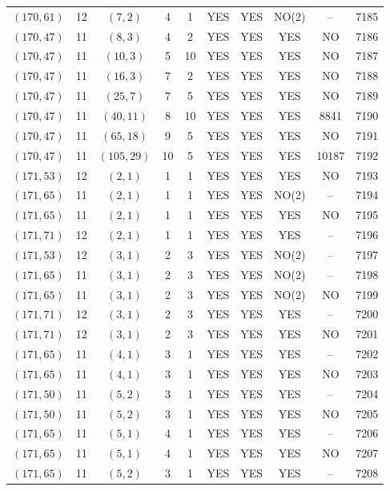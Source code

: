 \begin{longtable}{|c|c|c|c|c|c|c|c|c|c|}
$(170, 61)$ & 12 & $(7, 2)$ & 4 & 1 & YES & YES & NO(2) & -- & 7185\\
$(170, 47)$ & 11 & $(8, 3)$ & 4 & 2 & YES & YES & YES & NO & 7186\\
$(170, 47)$ & 11 & $(10, 3)$ & 5 & 10 & YES & YES & YES & NO & 7187\\
$(170, 47)$ & 11 & $(16, 3)$ & 7 & 2 & YES & YES & YES & NO & 7188\\
$(170, 47)$ & 11 & $(25, 7)$ & 7 & 5 & YES & YES & YES & NO & 7189\\
$(170, 47)$ & 11 & $(40, 11)$ & 8 & 10 & YES & YES & YES & 8841 & 7190\\
$(170, 47)$ & 11 & $(65, 18)$ & 9 & 5 & YES & YES & YES & NO & 7191\\
$(170, 47)$ & 11 & $(105, 29)$ & 10 & 5 & YES & YES & YES & 10187 & 7192\\
$(171, 53)$ & 12 & $(2, 1)$ & 1 & 1 & YES & YES & YES & NO & 7193\\
$(171, 65)$ & 11 & $(2, 1)$ & 1 & 1 & YES & YES & NO(2) & -- & 7194\\
$(171, 65)$ & 11 & $(2, 1)$ & 1 & 1 & YES & YES & YES & NO & 7195\\
$(171, 71)$ & 12 & $(2, 1)$ & 1 & 1 & YES & YES & YES & -- & 7196\\
$(171, 53)$ & 12 & $(3, 1)$ & 2 & 3 & YES & YES & NO(2) & -- & 7197\\
$(171, 65)$ & 11 & $(3, 1)$ & 2 & 3 & YES & YES & NO(2) & -- & 7198\\
$(171, 65)$ & 11 & $(3, 1)$ & 2 & 3 & YES & YES & NO(2) & NO & 7199\\
$(171, 71)$ & 12 & $(3, 1)$ & 2 & 3 & YES & YES & YES & -- & 7200\\
$(171, 71)$ & 12 & $(3, 1)$ & 2 & 3 & YES & YES & YES & NO & 7201\\
$(171, 65)$ & 11 & $(4, 1)$ & 3 & 1 & YES & YES & YES & -- & 7202\\
$(171, 65)$ & 11 & $(4, 1)$ & 3 & 1 & YES & YES & YES & NO & 7203\\
$(171, 50)$ & 11 & $(5, 2)$ & 3 & 1 & YES & YES & YES & -- & 7204\\
$(171, 50)$ & 11 & $(5, 2)$ & 3 & 1 & YES & YES & YES & NO & 7205\\
$(171, 65)$ & 11 & $(5, 1)$ & 4 & 1 & YES & YES & YES & -- & 7206\\
$(171, 65)$ & 11 & $(5, 1)$ & 4 & 1 & YES & YES & YES & NO & 7207\\
$(171, 65)$ & 11 & $(5, 2)$ & 3 & 1 & YES & YES & YES & -- & 7208\\

\end{longtable}
